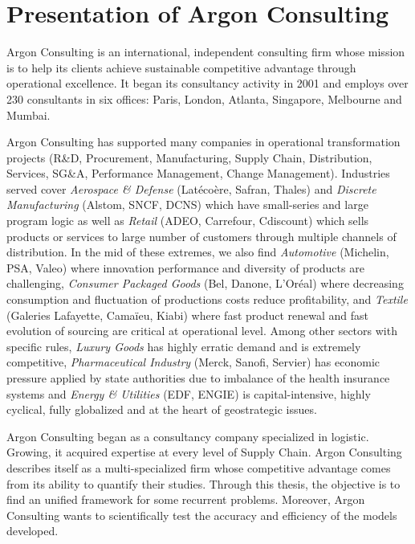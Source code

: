 \section{Presentation of Argon Consulting}


Argon Consulting is an international, independent consulting firm whose mission is to help its clients achieve sustainable competitive advantage through operational excellence.
It began its consultancy activity in 2001 and employs over 230 consultants in six offices: Paris, London, Atlanta, Singapore, Melbourne and Mumbai.


Argon Consulting has supported many companies in operational transformation projects (R\&D, Procurement, Manufacturing, Supply Chain, Distribution, Services, SG\&A, Performance Management, Change Management).
Industries served cover
\emph{Aerospace \& Defense} (Lat\'eco\`ere, Safran, Thales) and
\emph{Discrete Manufacturing} (Alstom, SNCF, DCNS) which have small-series and large program logic as well as
\emph{Retail} (ADEO, Carrefour, Cdiscount) which sells products or services to large number of customers through multiple channels of distribution.
In the mid of these extremes, we also find
\emph{Automotive} (Michelin, PSA, Valeo) where innovation performance and diversity of products are challenging,
\emph{Consumer Packaged Goods} (Bel, Danone, L'Oréal) where decreasing consumption and fluctuation of productions costs reduce profitability, and
\emph{Textile} (Galeries Lafayette, Cama\"ieu, Kiabi) where fast product renewal and fast evolution of sourcing are critical at operational level.
Among other sectors with specific rules,
\emph{Luxury Goods} has highly erratic demand and is extremely competitive,
\emph{Pharmaceutical Industry} (Merck, Sanofi, Servier) has economic pressure applied by state authorities due to imbalance of the health insurance systems and
\emph{Energy \& Utilities} (EDF, ENGIE) is capital-intensive, highly cyclical, fully globalized and at the heart of geostrategic issues.


Argon Consulting began as a consultancy company specialized in logistic.
Growing, it acquired expertise at every level of Supply Chain.
Argon Consulting describes itself as a multi-specialized firm whose competitive advantage comes from its ability to quantify their studies.
Through this thesis, the objective is to find an unified framework for some recurrent problems.
Moreover, Argon Consulting wants to scientifically test the accuracy and efficiency of the models developed.




